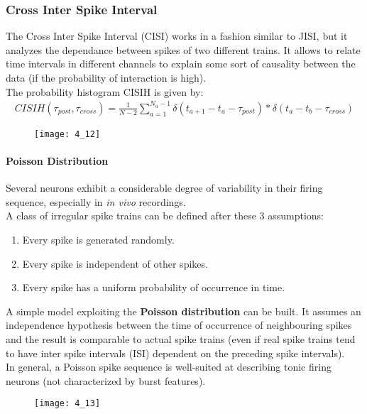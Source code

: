 \subsubsection{Cross Inter Spike Interval}
The Cross Inter Spike Interval (CISI) works in a fashion similar to JISI, but it analyzes the
dependance between spikes of two different trains. It allows to relate time intervals in different channels to explain some sort of causality between the data (if the probability of interaction is high).\\
The probability histogram CISIH is given by:
\begin{align*}
    CISIH(\tau_{post},\tau_{cross})=\frac{1}{N-2}\sum_{a=1}^{N_a-1}\delta{(t_{a+1}-t_{a}-\tau_{post})}\ast \delta{(t_a-t_b-\tau_{cross})}
\end{align*}
\begin{figure}[H]
    \texttt{[image: 4\_12]}
    \centering
\end{figure}

\paragraph{Poisson Distribution}
Several neurons exhibit a considerable degree of variability in their firing
sequence, especially in \textit{in vivo} recordings.\\
A class of irregular spike trains can be defined after these 3 assumptions:
\begin{enumerate}
    \item Every spike is generated randomly.
    \item Every spike is independent of other spikes.
    \item Every spike has a uniform probability of occurrence in time.
\end{enumerate}
A simple model exploiting the \textbf{Poisson distribution} can be built. It assumes an independence hypothesis between the time of occurrence of neighbouring spikes and the result is comparable to actual spike trains (even if real spike trains tend to have inter spike intervals
(ISI) dependent on the preceding spike intervals).\\
In general, a Poisson spike sequence is well-suited at describing tonic firing neurons (not characterized by burst features).
\begin{figure}[H]
    \texttt{[image: 4\_13]}
    \centering
\end{figure}

